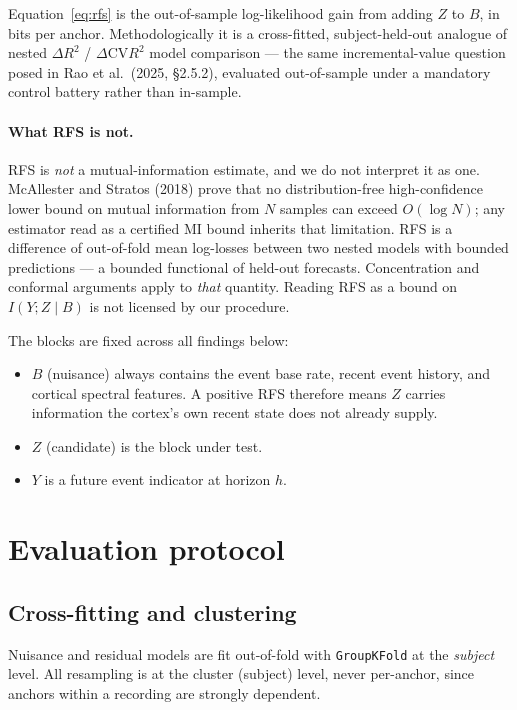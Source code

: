 \documentclass[11pt]{article}
\begin{document}
Equation~\eqref{eq:rfs} is the out-of-sample log-likelihood gain from adding $Z$
to $B$, in bits per anchor. Methodologically it is a cross-fitted,
subject-held-out analogue of nested $\Delta R^2$ / $\Delta \mathrm{CV}R^2$ model
comparison --- the same incremental-value question posed in
Rao et al.~(2025, \S2.5.2), evaluated out-of-sample under a mandatory control
battery rather than in-sample.

\paragraph{What RFS is not.} RFS is \emph{not} a mutual-information estimate, and
we do not interpret it as one. McAllester and Stratos (2018) prove that no
distribution-free high-confidence lower bound on mutual information from $N$
samples can exceed $O(\log N)$; any estimator read as a certified MI bound
inherits that limitation. RFS is a difference of out-of-fold mean log-losses
between two nested models with bounded predictions --- a bounded functional of
held-out forecasts. Concentration and conformal arguments apply to \emph{that}
quantity. Reading RFS as a bound on $I(Y; Z \mid B)$ is not licensed by our
procedure.

\medskip
The blocks are fixed across all findings below:
\begin{itemize}
  \item $B$ (nuisance) always contains the event base rate, recent event history,
        and cortical spectral features. A positive RFS therefore means $Z$ carries
        information the cortex's own recent state does not already supply.
  \item $Z$ (candidate) is the block under test.
  \item $Y$ is a future event indicator at horizon $h$.
\end{itemize}

\section{Evaluation protocol}

\subsection{Cross-fitting and clustering}
Nuisance and residual models are fit out-of-fold with \texttt{GroupKFold} at the
\emph{subject} level. All resampling is at the cluster (subject) level, never
per-anchor, since anchors within a recording are strongly dependent.
\end{document}
